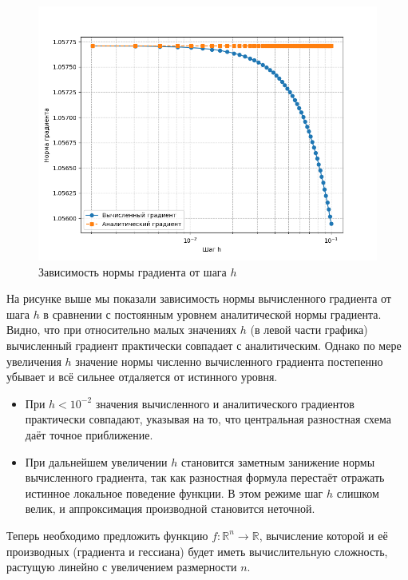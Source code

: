 \documentclass[a4paper,12pt]{article}
\begin{document}
\begin{figure}[H]
    \centering \includegraphics[width=\textwidth]{images/comp.png}
    \caption{Зависимость нормы градиента от шага \(h\)}
\end{figure}
\noindent На рисунке выше мы показали зависимость нормы вычисленного градиента от шага \(h\) в сравнении с постоянным уровнем аналитической нормы градиента. Видно, что при относительно малых значениях \(h\) (в левой части графика) вычисленный градиент практически совпадает с аналитическим. Однако по мере увеличения \(h\) значение нормы численно вычисленного градиента постепенно убывает и всё сильнее отдаляется от истинного уровня.
\begin{itemize}
    \item При \( h < 10^{-2}\) значения вычисленного и аналитического градиентов практически совпадают, указывая на то, что центральная разностная схема даёт точное приближение.
    \item При дальнейшем увеличении \(h\) становится заметным занижение нормы вычисленного градиента, так как разностная формула перестаёт отражать истинное локальное поведение функции. В этом режиме шаг \(h\) слишком велик, и аппроксимация производной становится неточной.
\end{itemize}
 

Теперь необходимо предложить функцию \(f: \mathbb{R}^n \to \mathbb{R}\), вычисление которой и её производных (градиента и гессиана) будет иметь вычислительную сложность, растущую линейно с увеличением размерности \(n\).
\end{document}

